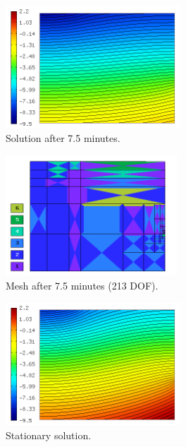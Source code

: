 \documentclass[final,3p,times,twocolumn]{elsarticle}
\begin{document}
\begin{figure}[!ht]
\begin{center}
\vspace{-3mm}
\includegraphics[height=4.6cm]{see_sol_1.png}
\end{center}
\vspace{-6mm}
\caption{Solution after 7.5 minutes.}
\label{fig:see-sol-1}
\end{figure}

\begin{figure}[!ht]
\begin{center}
\hspace{6mm}
\includegraphics[height=4.5cm]{see_mesh_1.png}
\end{center}
\vspace{-6mm}
\caption{Mesh after 7.5 minutes (213 DOF).}
\label{fig:see-mesh-1}
\end{figure}

\begin{figure}[!ht]
\begin{center}
\includegraphics[height=4.6cm]{see_sol_4.png}
\end{center}
\vspace{-6mm}
\caption{Stationary solution.}
\label{fig:see-sol-4}
\end{figure}
\end{document}
